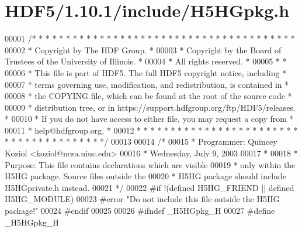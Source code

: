 \hypertarget{_h_d_f5_21_810_81_2include_2_h5_h_gpkg_8h_source}{}\section{H\+D\+F5/1.10.1/include/\+H5\+H\+Gpkg.h}
\label{_h_d_f5_21_810_81_2include_2_h5_h_gpkg_8h_source}

\begin{DoxyCode}
00001 \textcolor{comment}{/* * * * * * * * * * * * * * * * * * * * * * * * * * * * * * * * * * * * * * *}
00002 \textcolor{comment}{ * Copyright by The HDF Group.                                               *}
00003 \textcolor{comment}{ * Copyright by the Board of Trustees of the University of Illinois.         *}
00004 \textcolor{comment}{ * All rights reserved.                                                      *}
00005 \textcolor{comment}{ *                                                                           *}
00006 \textcolor{comment}{ * This file is part of HDF5.  The full HDF5 copyright notice, including     *}
00007 \textcolor{comment}{ * terms governing use, modification, and redistribution, is contained in    *}
00008 \textcolor{comment}{ * the COPYING file, which can be found at the root of the source code       *}
00009 \textcolor{comment}{ * distribution tree, or in https://support.hdfgroup.org/ftp/HDF5/releases.  *}
00010 \textcolor{comment}{ * If you do not have access to either file, you may request a copy from     *}
00011 \textcolor{comment}{ * help@hdfgroup.org.                                                        *}
00012 \textcolor{comment}{ * * * * * * * * * * * * * * * * * * * * * * * * * * * * * * * * * * * * * * */}
00013 
00014 \textcolor{comment}{/*}
00015 \textcolor{comment}{ * Programmer: Quincey Koziol <koziol@ncsa.uiuc.edu>}
00016 \textcolor{comment}{ *             Wednesday, July 9, 2003}
00017 \textcolor{comment}{ *}
00018 \textcolor{comment}{ * Purpose:     This file contains declarations which are visible}
00019 \textcolor{comment}{ *              only within the H5HG package. Source files outside the}
00020 \textcolor{comment}{ *              H5HG package should include H5HGprivate.h instead.}
00021 \textcolor{comment}{ */}
00022 \textcolor{preprocessor}{#if !(defined H5HG\_FRIEND || defined H5HG\_MODULE)}
00023 \textcolor{preprocessor}{#error "Do not include this file outside the H5HG package!"}
00024 \textcolor{preprocessor}{#endif}
00025 
00026 \textcolor{preprocessor}{#ifndef \_H5HGpkg\_H}
00027 \textcolor{preprocessor}{#define \_H5HGpkg\_H}

\end{DoxyCode}
